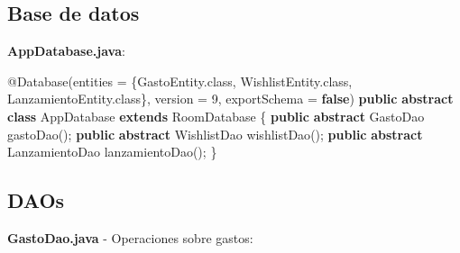 \documentclass[
  spanish,
  11pt,
  paper=a4,
  ,captions=tableheading
]{scrartcl}
\newenvironment{Shaded}{}{}
\newcommand{\AttributeTok}[1]{\textcolor[rgb]{0.49,0.56,0.16}{#1}}
\newcommand{\DecValTok}[1]{\textcolor[rgb]{0.25,0.63,0.44}{#1}}
\newcommand{\FunctionTok}[1]{\textcolor[rgb]{0.02,0.16,0.49}{#1}}
\newcommand{\KeywordTok}[1]{\textcolor[rgb]{0.00,0.44,0.13}{\textbf{#1}}}
\newcommand{\NormalTok}[1]{#1}
\newcommand{\OperatorTok}[1]{\textcolor[rgb]{0.40,0.40,0.40}{#1}}
\begin{document}
\hypertarget{base-de-datos}{%
\subsection{Base de datos}\label{base-de-datos}}

\textbf{AppDatabase.java}:

\begin{Shaded}
\begin{Highlighting}[]
\AttributeTok{@Database}\OperatorTok{(}\NormalTok{entities }\OperatorTok{=} \OperatorTok{\{}\NormalTok{GastoEntity}\OperatorTok{.}\FunctionTok{class}\OperatorTok{,}\NormalTok{ WishlistEntity}\OperatorTok{.}\FunctionTok{class}\OperatorTok{,}
\NormalTok{    LanzamientoEntity}\OperatorTok{.}\FunctionTok{class}\OperatorTok{\},}\NormalTok{ version }\OperatorTok{=} \DecValTok{9}\OperatorTok{,}\NormalTok{ exportSchema }\OperatorTok{=} \KeywordTok{false}\OperatorTok{)}
\KeywordTok{public} \KeywordTok{abstract} \KeywordTok{class}\NormalTok{ AppDatabase }\KeywordTok{extends}\NormalTok{ RoomDatabase }\OperatorTok{\{}
    \KeywordTok{public} \KeywordTok{abstract}\NormalTok{ GastoDao }\FunctionTok{gastoDao}\OperatorTok{();}
    \KeywordTok{public} \KeywordTok{abstract}\NormalTok{ WishlistDao }\FunctionTok{wishlistDao}\OperatorTok{();}
    \KeywordTok{public} \KeywordTok{abstract}\NormalTok{ LanzamientoDao }\FunctionTok{lanzamientoDao}\OperatorTok{();}
\OperatorTok{\}}
\end{Highlighting}
\end{Shaded}

\hypertarget{daos}{%
\subsection{DAOs}\label{daos}}

\textbf{GastoDao.java} - Operaciones sobre gastos:
\end{document}
